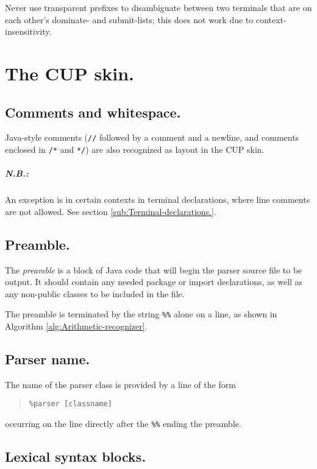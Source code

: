 \documentclass[12pt,english,twoside]{report}
\begin{document}
Never use transparent prefixes to disambiguate between two terminals
that are on each other's dominate- and submit-lists; this does not
work due to context-insensitivity.

\chapter{\label{cha:CUP-skin.}The CUP skin.}


\section{Comments and whitespace.}

Java-style comments (\texttt{//} followed by a comment and a newline,
and comments enclosed in \texttt{/{*}} and \texttt{{*}/}) are also
recognized as layout in the CUP skin. 


\paragraph{N.B.:}

An exception is in certain contexts in terminal declarations, where
line comments are not allowed. See section \ref{sub:Terminal-declarations.}.


\section{Preamble.}

The \emph{preamble} is a block of Java code that will begin the parser
source file to be output. It should contain any needed package or
import declarations, as well as any non-public classes to be included
in the file.

The preamble is terminated by the string \texttt{\%\%} alone on a
line, as shown in Algorithm \ref{alg:Arithmetic-recognizer}.


\section{Parser name.}

The name of the parser class is provided by a line of the form

\begin{quote}
\texttt{\%parser {[}classname]}
\end{quote}
occurring on the line directly after the \texttt{\%\%} ending the
preamble.


\section{Lexical syntax blocks.}
\end{document}
